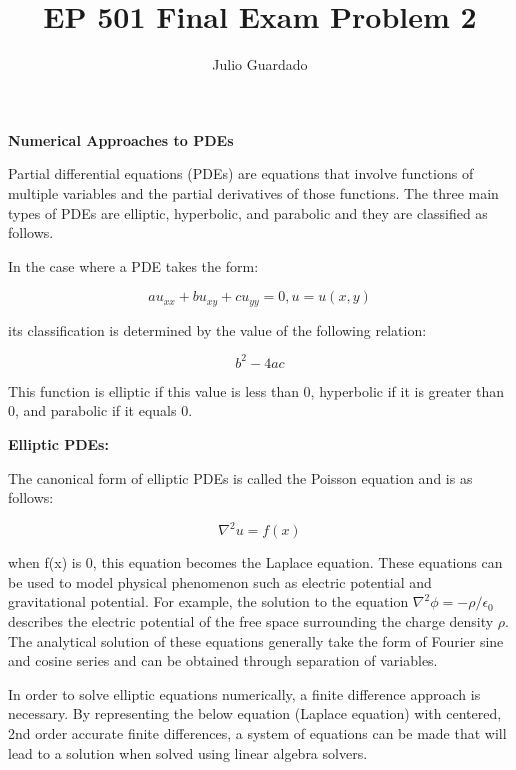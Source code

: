 \documentclass{article}
\begin{document}
	  
\title{EP 501 Final Exam Problem 2}
\author{Julio Guardado}

\maketitle	  
\pagebreak

	  \textbf{Numerical Approaches to PDEs}
      
      Partial differential equations (PDEs) are equations that involve functions of multiple variables and the partial derivatives of those functions. The three main types of PDEs are elliptic, hyperbolic, and parabolic and they are classified as follows.
      
      In the case where a PDE takes the form:
      
      \begin{equation}
      au_{xx} + bu_{xy} + cu_{yy} = 0, u = u(x,y)
      \end{equation}
      
      its classification is determined by the value of the following relation:
      
      \begin{equation}
      b^2 - 4ac
      \end{equation}
      
      This function is elliptic if this value is less than 0, hyperbolic if it is greater than 0, and parabolic if it equals 0.
      
      \bigskip
      
      \textbf{Elliptic PDEs:}
      
      The canonical form of elliptic PDEs is called the Poisson equation and is as follows:
      
      \begin{equation}
      \nabla^2 u = f(x)
      \end{equation}
      
      when f(x) is 0, this equation becomes the Laplace equation. These equations can be used to model physical phenomenon such as electric potential and gravitational potential. For example, the solution to the equation $ \nabla^2 \phi = -\rho/\epsilon_0$ describes the electric potential of the free space surrounding the charge density $\rho$. The analytical solution of these equations generally take the form of Fourier sine and cosine series and can be obtained through separation of variables. 
      
      In order to solve elliptic equations numerically, a finite difference approach is necessary. By representing the below equation (Laplace equation) with centered, 2nd order accurate finite differences, a system of equations can be made that will lead to a solution when solved using linear algebra solvers. 
      
\end{document}
